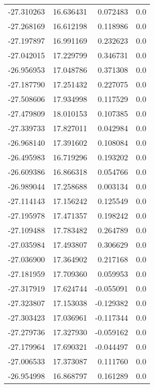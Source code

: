 \begin{tabular}{rrrr}
      -27.310263 &        16.636431 &    0.072483 &   0.0 \\
      -27.268169 &        16.612198 &    0.118986 &   0.0 \\
      -27.197897 &        16.991169 &    0.232623 &   0.0 \\
      -27.042015 &        17.229799 &    0.346731 &   0.0 \\
      -26.956953 &        17.048786 &    0.371308 &   0.0 \\
      -27.187790 &        17.251432 &    0.227075 &   0.0 \\
      -27.508606 &        17.934998 &    0.117529 &   0.0 \\
      -27.479809 &        18.010153 &    0.107385 &   0.0 \\
      -27.339733 &        17.827011 &    0.042984 &   0.0 \\
      -26.968140 &        17.391602 &    0.108084 &   0.0 \\
      -26.495983 &        16.719296 &    0.193202 &   0.0 \\
      -26.609386 &        16.866318 &    0.054766 &   0.0 \\
      -26.989044 &        17.258688 &    0.003134 &   0.0 \\
      -27.114143 &        17.156242 &    0.125549 &   0.0 \\
      -27.195978 &        17.471357 &    0.198242 &   0.0 \\
      -27.109488 &        17.783482 &    0.264789 &   0.0 \\
      -27.035984 &        17.493807 &    0.306629 &   0.0 \\
      -27.036900 &        17.364902 &    0.217168 &   0.0 \\
      -27.181959 &        17.709360 &    0.059953 &   0.0 \\
      -27.317919 &        17.624744 &   -0.055091 &   0.0 \\
      -27.323807 &        17.153038 &   -0.129382 &   0.0 \\
      -27.303423 &        17.036961 &   -0.117344 &   0.0 \\
      -27.279736 &        17.327930 &   -0.059162 &   0.0 \\
      -27.179964 &        17.690321 &   -0.044497 &   0.0 \\
      -27.006533 &        17.373087 &    0.111760 &   0.0 \\
      -26.954998 &        16.868797 &    0.161289 &   0.0 \\

\end{tabular}
